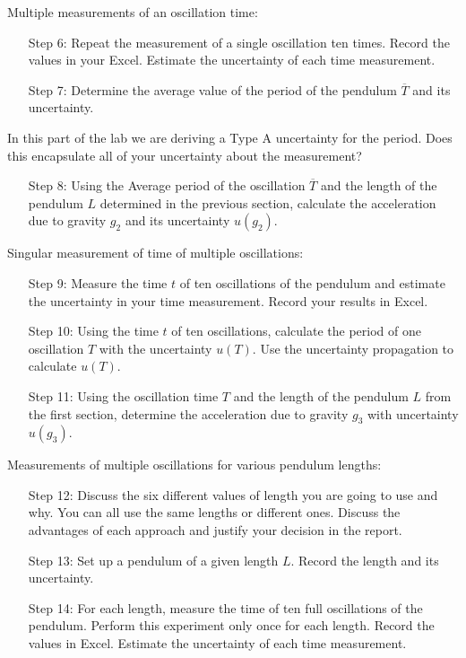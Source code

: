 Multiple measurements of an oscillation time:


\begin{itemize}[leftmargin = 50pt]
    \item[Step 6:] Repeat the measurement of a single oscillation ten times. Record the values in your Excel. Estimate the uncertainty of each time measurement.
    \item[Step 7:] Determine the average value of the period of the pendulum $\overline{T}$ and its uncertainty.
\end{itemize}

In this part of the lab we are deriving a Type A uncertainty for the period. Does this encapsulate all of your uncertainty about the measurement? 


\begin{itemize}[leftmargin = 50pt]
    \item[Step 8:] Using the Average period of the oscillation $\overline{T}$ and the length of the pendulum $L$ determined in the previous section, calculate the acceleration due to gravity $g_2$ and its uncertainty $u(g_2)$.
\end{itemize}

Singular measurement of time of multiple oscillations:


\begin{itemize}[leftmargin = 50pt]
    \item[Step 9:] Measure the time $t$ of ten oscillations of the pendulum and estimate the uncertainty in your time measurement. Record your results in Excel.
    \item[Step 10:] Using the time $t$ of ten oscillations, calculate the period of one oscillation $T$ with the uncertainty $u(T)$. Use the uncertainty propagation to calculate $u(T)$.
    \item[Step 11:] Using the oscillation time $T$ and the length of the pendulum $L$ from the first section, determine the acceleration due to gravity $g_3$ with uncertainty $u(g_3)$.
\end{itemize}

Measurements of multiple oscillations for various pendulum lengths:


\begin{itemize}[leftmargin = 50pt]
    \item[Step 12:] Discuss the six different values of length you are going to use and why. You can all use the same lengths or different ones. Discuss the advantages of each approach and justify your decision in the report.
    \item[Step 13:] Set up a pendulum of a given length $L$. Record the length and its uncertainty.
    \item[Step 14:] For each length, measure the time of ten full oscillations of the pendulum. Perform this experiment only once for each length. Record the values in Excel. Estimate the uncertainty of each time measurement.
\end{itemize}

